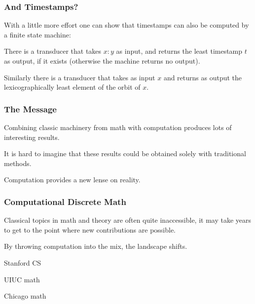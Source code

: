 \documentclass[handout,10pt]{ksbeamer}
\begin{document}
\begin{frame}
\frametitle{And Timestamps?}

With a little more effort one can show that timestamps can also be computed
by a finite state machine:
\vspace{5ex}

There is a transducer that takes $x{:}y$ as input, and returns the least
timestamp $t$ as output, if it exists (otherwise the machine returns no output).
\vspace{5ex}

Similarly there is a transducer that takes as input $x$ and returns as output
the lexicographically least element of the orbit of $x$. 

\end{frame}



\begin{frame}
\frametitle{The Message}

Combining classic machinery from math with computation produces lots 
of interesting results. 
\vspace{5ex} 

It is hard to imagine that these results could be obtained solely with
traditional methods.
\vspace{5ex}


\begin{graybox}
\qquad  Computation provides a new lense on reality. 
\end{graybox}

\end{frame}

\begin{frame}
\frametitle{Computational Discrete Math}

Classical topics in math and theory are often quite inaccessible, 
it may take years to get to the point where new contributions are possible. 
\vspace{2ex} 

By throwing computation into the mix, the landscape shifts. 
\vspace{5ex} 

\begin{description}[style=nextline]
\addtolength{\itemsep}{2mm}
\item[Kevin Lewi]   Stanford CS
\item[Tsutomo Okano]  UIUC math
\item[Tim Becker]  Chicago math
\end{description}

\end{frame}
\end{document}
